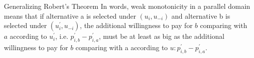 \begin{frame}{Generalizing Robert's Theorem}
In words, weak monotonicity in a parallel domain means that if alternative a is selected under $(u_{i},u_{-i})$ and alternative b is selected under $(u_{i}^{'},u_{-i})$, the additional willingness to pay for $b$ comparing with
$a$ according to $u_{i}^{'}$, i.e. $p_{i,b}^{'}-p_{i,a}^{'}$, must be at least as big as the additional willingness to pay for $b$ comparing with a according to $u:p_{i,b}^{'}-p_{i,a}^{'}$.
\end{frame}
